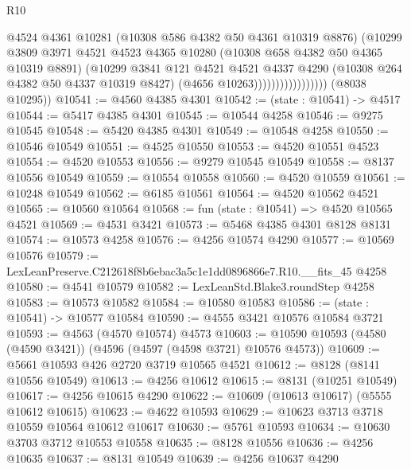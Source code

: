 \begin{lexlean}{R10}
\begin{coremodule}
                                  @4524
                                  @4361
                                  @10281
                                  (@10308 @586 @4382 @50 @4361 @10319 @8876)
                                  (@10299
                                    @3809
                                    @3971
                                    @4521
                                    @4523
                                    @4365
                                    @10280
                                    (@10308 @658 @4382 @50 @4365 @10319 @8891)
                                    (@10299
                                      @3841
                                      @121
                                      @4521
                                      @4521
                                      @4337
                                      @4290
                                      (@10308 @264 @4382 @50 @4337 @10319 @8427)
                                      (@4656 @10263)))))))))))))))))
      (@8038 @10295))
@10541 := @4560 @4385 @4301
@10542 := (state : @10541) -> @4517
@10544 := @5417 @4385 @4301
@10545 := @10544 @4258
@10546 := @9275 @10545
@10548 := @5420 @4385 @4301
@10549 := @10548 @4258
@10550 := @10546 @10549
@10551 := @4525 @10550
@10553 := @4520 @10551 @4523
@10554 := @4520 @10553
@10556 := @9279 @10545 @10549
@10558 := @8137 @10556 @10549
@10559 := @10554 @10558
@10560 := @4520 @10559
@10561 := @10248 @10549
@10562 := @6185 @10561
@10564 := @4520 @10562 @4521
@10565 := @10560 @10564
@10568 := fun (state : @10541) => @4520 @10565 @4521
@10569 := @4531 @3421
@10573 := @5468 @4385 @4301 @8128 @8131
@10574 := @10573 @4258
@10576 := @4256 @10574 @4290
@10577 := @10569 @10576
@10579 := LexLeanPreserve.C212618f8b6ebac3a5c1e1dd0896866e7.R10.__fits_45 @4258
@10580 := @4541 @10579
@10582 := LexLeanStd.Blake3.roundStep @4258
@10583 := @10573 @10582
@10584 := @10580 @10583
@10586 := (state : @10541) -> @10577 @10584
@10590 := @4555 @3421 @10576 @10584 @3721
@10593 := @4563 (@4570 @10574) @4573
@10603 := @10590 @10593 (@4580 (@4590 @3421)) (@4596 (@4597 (@4598 @3721) @10576 @4573))
@10609 := @5661 @10593 @426 @2720 @3719 @10565 @4521
@10612 := @8128 (@8141 @10556 @10549)
@10613 := @4256 @10612
@10615 := @8131 (@10251 @10549)
@10617 := @4256 @10615 @4290
@10622 := @10609 (@10613 @10617) (@5555 @10612 @10615)
@10623 := @4622 @10593
@10629 := @10623 @3713 @3718 @10559 @10564 @10612 @10617
@10630 := @5761 @10593
@10634 := @10630 @3703 @3712 @10553 @10558
@10635 := @8128 @10556
@10636 := @4256 @10635
@10637 := @8131 @10549
@10639 := @4256 @10637 @4290

\end{coremodule}
\end{lexlean}
